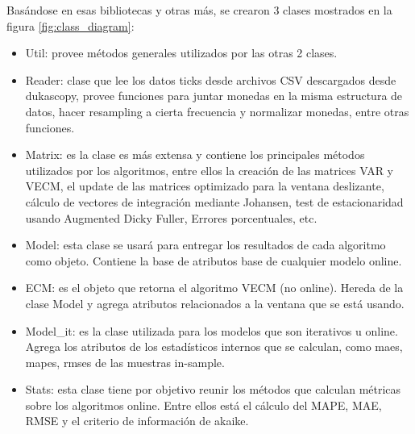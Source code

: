 \noindent Basándose en esas bibliotecas y otras más, se crearon 3 clases
mostrados en la figura \ref{fig:class_diagram}:
\begin{itemize}
 \item Util: provee métodos generales utilizados por las otras 2 clases.
 \item Reader: clase que lee los datos ticks desde archivos CSV descargados
desde dukascopy, provee funciones para juntar monedas en la misma estructura de
datos, hacer resampling a cierta frecuencia y normalizar monedas, entre otras
funciones.
 \item Matrix: es la clase es más extensa y contiene los principales métodos
utilizados por los algoritmos, entre ellos la creación de las matrices VAR y
VECM, el update de las matrices optimizado para la ventana deslizante, cálculo
de vectores de integración mediante Johansen, test de estacionaridad usando
Augmented Dicky Fuller, Errores porcentuales, etc.
 \item Model: esta clase se usará para entregar los resultados de cada
algoritmo como objeto. Contiene la base de atributos base de cualquier modelo
online.
 \item ECM: es el objeto que retorna el algoritmo VECM (no online). Hereda de
la clase Model y agrega atributos relacionados a la ventana que se está usando.
 \item Model\_it: es la clase utilizada para los modelos que son iterativos u 
online. Agrega los atributos de los estadísticos internos que se calculan, como
maes, mapes, rmses de las muestras in-sample.
 \item Stats: esta clase tiene por objetivo reunir los métodos que calculan
métricas sobre los algoritmos online. Entre ellos está el cálculo del MAPE,
MAE, RMSE y el criterio de información de akaike.
\end{itemize}

